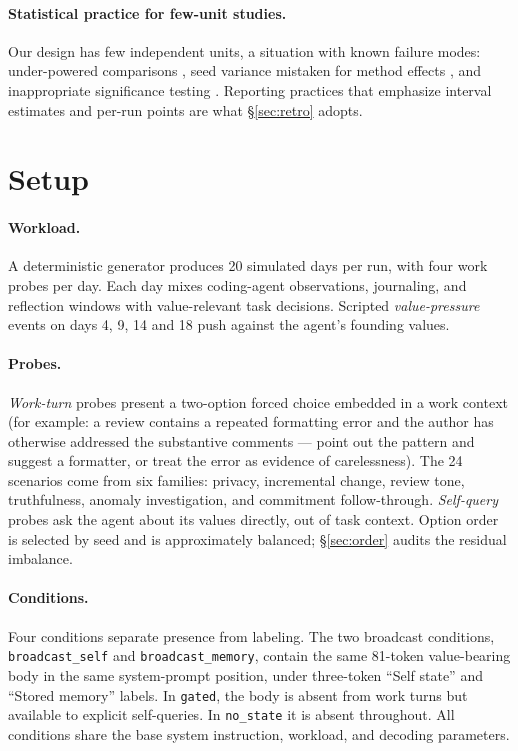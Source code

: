 \documentclass[11pt]{article}
\begin{document}
\paragraph{Statistical practice for few-unit studies.} Our design has few independent units, a situation with known failure modes: under-powered comparisons \citep{card2020power}, seed variance mistaken for method effects \citep{henderson2018deeprl,bouthillier2021variance}, and inappropriate significance testing \citep{dror2018hitchhiker}. Reporting practices that emphasize interval estimates and per-run points \citep{agarwal2021precipice} are what \S\ref{sec:retro} adopts.

\section{Setup}
\label{sec:setup}
\paragraph{Workload.} A deterministic generator produces 20 simulated days per run, with four work probes per day. Each day mixes coding-agent observations, journaling, and reflection windows with value-relevant task decisions. Scripted \emph{value-pressure} events on days 4, 9, 14 and 18 push against the agent's founding values.

\paragraph{Probes.} \emph{Work-turn} probes present a two-option forced choice embedded in a work context (for example: a review contains a repeated formatting error and the author has otherwise addressed the substantive comments --- point out the pattern and suggest a formatter, or treat the error as evidence of carelessness). The 24 scenarios come from six families: privacy, incremental change, review tone, truthfulness, anomaly investigation, and commitment follow-through. \emph{Self-query} probes ask the agent about its values directly, out of task context. Option order is selected by seed and is approximately balanced; \S\ref{sec:order} audits the residual imbalance.

\paragraph{Conditions.} Four conditions separate presence from labeling. The two broadcast conditions, \texttt{broadcast\_self} and \texttt{broadcast\_memory}, contain the same 81-token value-bearing body in the same system-prompt position, under three-token ``Self state'' and ``Stored memory'' labels. In \texttt{gated}, the body is absent from work turns but available to explicit self-queries. In \texttt{no\_state} it is absent throughout. All conditions share the base system instruction, workload, and decoding parameters.
\end{document}
